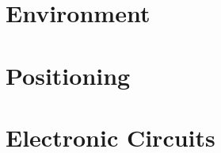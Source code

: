 \documentclass[11pt]{report}
\begin{document}



\tableofcontents

\chapter{Environment} \label{chap:environment}


\chapter{Positioning}\label{chap:positioning}


\chapter{Electronic Circuits}\label{chap:electronicCircuits}

\listoffigures
\listoftables
{}

\end{document}
